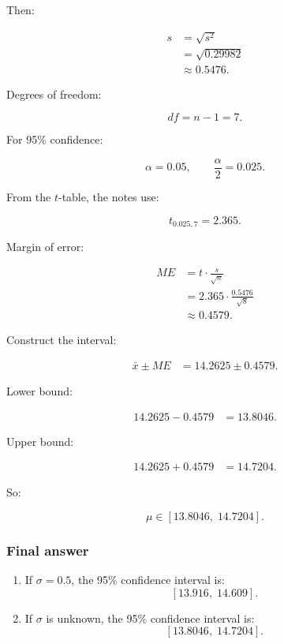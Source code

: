 \documentclass[10pt]{article}
\begin{document}
Then:

\begin{align*}
s
&=\sqrt{s^2} \\[2mm]
&=\sqrt{0.29982} \\[2mm]
&\approx 0.5476.
\end{align*}

Degrees of freedom:

\[
df=n-1=7.
\]

For 95\% confidence:

\[
\alpha=0.05,
\qquad
\frac{\alpha}{2}=0.025.
\]

From the \(t\)-table, the notes use:

\[
t_{0.025,7}=2.365.
\]

Margin of error:

\begin{align*}
ME
&=t\cdot \frac{s}{\sqrt{n}} \\[2mm]
&=2.365\cdot \frac{0.5476}{\sqrt{8}} \\[2mm]
&\approx 0.4579.
\end{align*}

Construct the interval:

\begin{align*}
\bar{x}\pm ME
&=14.2625\pm 0.4579.
\end{align*}

Lower bound:

\begin{align*}
14.2625-0.4579
&=13.8046.
\end{align*}

Upper bound:

\begin{align*}
14.2625+0.4579
&=14.7204.
\end{align*}

So:

\[
\mu\in [13.8046,\;14.7204].
\]

\subsubsection*{Final answer}
\begin{enumerate}[label=\alph*)]
\item If \(\sigma=0.5\), the 95\% confidence interval is:
\[
[13.916,\;14.609].
\]

\item If \(\sigma\) is unknown, the 95\% confidence interval is:
\[
[13.8046,\;14.7204].
\]
\end{enumerate}
\end{document}
